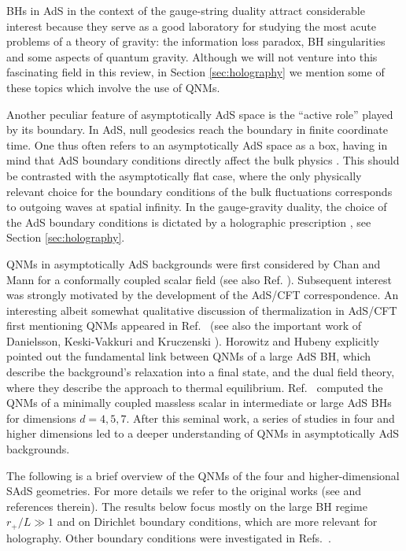 \documentclass[]{iopart}
\begin{document}
BHs in AdS in the context of the gauge-string duality attract considerable
interest because they serve as a good laboratory for studying the most acute
problems of a theory of gravity: the information loss paradox, BH
singularities and some aspects of quantum gravity. Although we will not
venture into this fascinating field in this review, in Section
\ref{sec:holography} we mention some of these topics which involve the use of
QNMs.

Another peculiar feature of asymptotically AdS space is the ``active role''
played by its boundary. In AdS, null geodesics reach the boundary in finite
coordinate time. One thus often refers to an asymptotically AdS space as a
box, having in mind that AdS boundary conditions directly affect the bulk
physics \cite{Wald:1980jn,Ishibashi:2003jd,Ishibashi:2004wx}.  This should be
contrasted with the asymptotically flat case, where the only physically
relevant choice for the boundary conditions of the bulk fluctuations
corresponds to outgoing waves at spatial infinity.  In the gauge-gravity
duality, the choice of the AdS boundary conditions is dictated by a
holographic prescription
\cite{Son:2002sd,Herzog:2002pc,Skenderis:2008dh,Skenderis:2008dg}, see Section
\ref{sec:holography}.

QNMs in asymptotically AdS backgrounds were first considered by Chan and Mann
for a conformally coupled scalar field \cite{Chan:1996yk} (see also
Ref. \cite{Chan:1999sc}).  Subsequent interest was strongly motivated by the
development of the AdS/CFT correspondence.  An interesting albeit somewhat
qualitative discussion of thermalization in AdS/CFT first mentioning QNMs
appeared in Ref.~\cite{KalyanaRama:1999zj} (see also the important work of
Danielsson, Keski-Vakkuri and Kruczenski \cite{Danielsson:1999zt,
  Danielsson:1999fa}).
%
Horowitz and Hubeny \cite{Horowitz:1999jd} explicitly pointed out the
fundamental link between QNMs of a large AdS BH, which describe the
background's relaxation into a final state, and the dual field theory, where
they describe the approach to thermal equilibrium. Ref.~\cite{Horowitz:1999jd}
computed the QNMs of a minimally coupled massless scalar in intermediate or
large AdS BHs for dimensions $d=4,5,7$.  After this seminal work, a series of
studies in four and higher dimensions led to a deeper understanding of QNMs in
asymptotically AdS backgrounds.

The following is a brief overview of the QNMs of the four and
higher-dimensional SAdS geometries. For more details we refer to the original
works (see \cite{Horowitz:1999jd,Natario:2004jd,Cardoso:2001bb,Cardoso:2001vs,
  Konoplya:2002zu,Cardoso:2003cj,Berti:2003ud,Musiri:2003rv,Musiri:2003rs,
  Cardoso:2004up,Musiri:2005ev,Miranda:2005qx,Friess:2006kw,Govindarajan:2000vq,Zhu:2001vi,Cardoso:2002cf,Wang:2001tk,
  Konoplya:2003dd,Siopsis:2004up,Siopsis:2004as,LopezOrtega:2006vn,Siopsis:2007wn}
and references therein). The results below focus mostly on the large BH regime
$r_+/L\gg 1$ and on Dirichlet boundary conditions, which are more relevant for
holography.  Other boundary conditions were investigated in
Refs.~\cite{Moss:2001ga,Michalogiorgakis:2006jc,Bakas:2008gz,Bakas:2008zg}.
\end{document}
